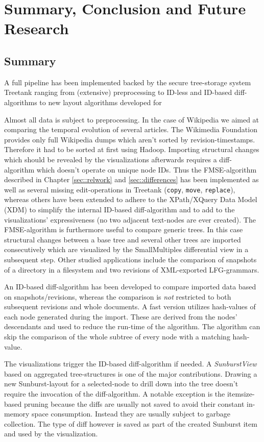 \section{Summary, Conclusion and Future Research}\label{sec::conclusion}
\subsection{Summary}
A full pipeline has been implemented backed by the secure tree-storage system Treetank ranging from (extensive) preprocessing to ID-less and ID-based diff-algorithms to new layout algorithms developed for 

Almost all data is subject to preprocessing. In the case of Wikipedia we aimed at comparing the temporal evolution of several articles. The Wikimedia Foundation provides only full Wikipedia dumps which aren't sorted by revision-timestamps. Therefore it had to be sorted at first using Hadoop. Importing structural changes which should be revealed by the visualizations afterwards requires a diff-algorithm which doesn't operate on unique node IDs. Thus the FMSE-algorithm described in Chapter \ref{sec::relwork} and \ref{sec::differences} has been implemented as well as several missing edit-operations in Treetank (\texttt{copy}, \texttt{move}, \texttt{replace}), whereas others have been extended to adhere to the XPath/XQuery Data Model (XDM) to simplify the internal ID-based diff-algorithm and to add to the visualizations' expressiveness (no two adjacent text-nodes are ever created). The FMSE-algorithm is furthermore useful to compare generic trees. In this case structural changes between a base tree and several other trees are imported consecutively which are visualized by the SmallMultiples differential view in a subsequent step. Other studied applications include the comparison of snapshots of a directory in a filesystem and two revisions of XML-exported LFG-grammars.

An ID-based diff-algorithm has been developed to compare imported data based on snapshots/revisions, whereas the comparison is \emph{not} restricted to both subsequent revisions and whole documents. A fast version utilizes hash-values of each node generated during the import. These are derived from the nodes' descendants and used to reduce the run-time of the algorithm. The algorithm can skip the comparison of the whole subtree of every node with a matching hash-value.

The visualizations trigger the ID-based diff-algorithm if needed. A \emph{SunburstView} based on aggregated tree-structures is one of the major contributions. Drawing a new Sunburst-layout for a selected-node to drill down into the tree doesn't require the invocation of the diff-algorithm. A notable exception is the itemsize-based pruning because the diffs are usually not saved to avoid their constant in-memory space consumption. Instead they are usually subject to garbage collection. The type of diff however is saved as part of the created Sunburst item and used by the visualization. 

